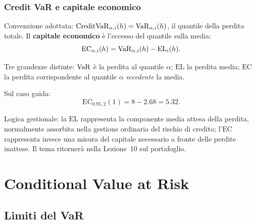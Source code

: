 \begin{frame}%
%

\frametitle{Credit VaR e capitale economico}%
%

%


Convenzione adottata: $\mathrm{CreditVaR}_{\alpha,i}(h) =\operatorname{VaR}_{\alpha,i}(h)$,
il quantile della perdita totale. Il \textbf{capitale economico} \`{e}
l'eccesso del quantile sulla media:
\[
\mathrm{EC}_{\alpha,i}(h) = \operatorname{VaR}_{\alpha,i}(h) - \mathrm{EL}_{i}(h).
\]


\medskip

\begin{stepitemize}
\item Tre grandezze distinte: $\operatorname{VaR}$ \`{e} la perdita al quantile $\alpha$;
$\mathrm{EL}$ la perdita media; $\mathrm{EC}$ la perdita corrispondente al
quantile $\alpha$ \emph{eccedente} la media.

\item Sul caso guida:
\[
\mathrm{EC}_{0.95,2}(1) = 8-2.68 = 5.32.
\]


\item Logica gestionale: la $\mathrm{EL}$ rappresenta la componente media
attesa della perdita, normalmente assorbita nella gestione ordinaria del
rischio di credito; l'$\mathrm{EC}$ rappresenta invece una misura del capitale
necessario a fronte delle perdite inattese. Il tema ritorner\`{a} nella
Lezione~10 sul portafoglio.
\end{stepitemize}

%

\transboxout
\end{frame}%




\section{Conditional Value at Risk}

\subsection{Limiti del VaR}%

